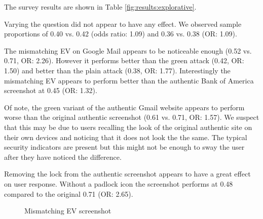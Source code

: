\documentclass[twoside,letterpaper]{soups}
\begin{document}
The survey results are shown in Table \ref{fig:results:explorative}.

Varying the question did not appear to have any effect. We observed sample proportions of 0.40 vs. 0.42 (odds ratio: 1.09) and 0.36 vs. 0.38 (OR: 1.09).

The mismatching EV on Google Mail appears to be noticeable enough (0.52 vs. 0.71, OR: 2.26). However it performs better than the green attack (0.42, OR: 1.50) and better than the plain attack (0.38, OR: 1.77). Interestingly the mismatching EV appears to perform better than the authentic Bank of America screenshot at 0.45 (OR: 1.32).

Of note, the green variant of the authentic Gmail website appears to perform worse than the original authentic screenshot (0.61 vs. 0.71, OR: 1.57). We suspect that this may be due to users recalling the look of the original authentic site on their own devices and noticing that it does not look the the same. The typical security indicators are present but this might not be enough to sway the user after they have noticed the difference.

Removing the lock from the authentic screenshot appears to have a great effect on user response. Without a padlock icon the screenshot performs at 0.48 compared to the original 0.71 (OR: 2.65).

\begin{figure}
\centering
{}
\caption{Mismatching EV screenshot}
\label{fig:variant:wrong_ev}
\end{figure}
\end{document}

